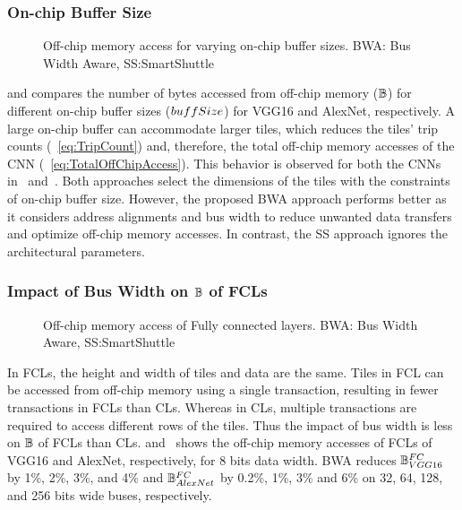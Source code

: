 \subsubsection{On-chip Buffer Size}
\begin{figure}[htb]
	\centering
	\hfil
	\hfil
	\caption{Off-chip memory access for varying on-chip buffer sizes. BWA: Bus Width Aware, SS:SmartShuttle}
	\label{fig:EffectOfVaryingOnChipBuffer}
	\vspace{-1.0em}
\end{figure}
 and  compares the number of bytes accessed from off-chip memory ($\mathbb{B}$) for different on-chip buffer sizes ($buffSize$) for VGG16 and AlexNet, respectively. A large on-chip buffer can accommodate larger tiles, which reduces the tiles' trip counts (~\eqref{eq:TripCount}) and, therefore, the total off-chip memory accesses of the CNN (~\eqref{eq:TotalOffChipAccess}). This behavior is observed for both the CNNs in~ and~. Both approaches select the dimensions of the tiles with the constraints of on-chip buffer size. However, the proposed BWA approach performs better as it considers address alignments and bus width to reduce unwanted data transfers and optimize off-chip memory accesses. In contrast, the SS approach ignores the architectural parameters.
\subsubsection{Impact of Bus Width on $\mathbb{B}$ of FCLs}
\begin{figure}[htb]
	\centering
	\hfil
	\hfil	
	\caption{Off-chip memory access of Fully connected layers. BWA: Bus Width Aware, SS:SmartShuttle}
	\label{fig:EffectOnFC}
	\vspace{-1.0em}
\end{figure}
In FCLs, the height and width of tiles and data are the same. Tiles in FCL can be accessed from off-chip memory using a single transaction, resulting in fewer transactions in FCLs than CLs. Whereas in CLs, multiple transactions are required to access different rows of the tiles. Thus the impact of bus width is less on $\mathbb{B}$ of FCLs than CLs.  and~ shows the off-chip memory accesses of FCLs of VGG16 and AlexNet, respectively, for 8 bits data width. BWA reduces $\mathbb{B}_{VGG16}^{FC}$ by 1\%, 2\%, 3\%, and 4\% and $\mathbb{B}_{AlexNet}^{FC}$ by 0.2\%, 1\%, 3\% and 6\% on 32, 64, 128, and 256 bits wide buses, respectively.
